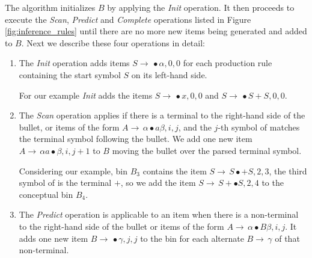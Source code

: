 \begin{isabellebody}
\begin{isamarkuptext}
The algorithm initializes $B$ by applying the \textit{Init} operation. It then proceeds to execute
the \textit{Scan}, \textit{Predict} and \textit{Complete} operations listed in Figure \ref{fig:inference_rules}
until there are no more new items being generated and added to $B$. Next we describe these four operations
in detail:

\begin{enumerate}
  \item The \textit{Init} operation adds items
    $S \rightarrow \, \bullet\alpha, 0, 0$ for each production rule containing the start symbol $S$ on its left-hand side.

    For our example \textit{Init} adds the items $S \rightarrow \, \bullet x, 0, 0$ and $S \rightarrow \, \bullet S + S, 0 , 0$.
  \item The \textit{Scan} operation applies if there is a terminal to the right-hand side of the bullet, or items of the form $A \rightarrow \, \alpha \bullet a \beta, i, j$,
    and the $j$-th symbol of \isa{{\isasymomega}} matches the terminal symbol following the bullet. We add one new item $A \rightarrow \, \alpha a \bullet \beta, i, j+1$
    to $B$ moving the bullet over the parsed terminal symbol.

    Considering our example, bin $B_3$ contains
    the item $S \rightarrow \, S \bullet + S, 2, 3$, the third symbol of \isa{{\isasymomega}} is the terminal $+$, so we add the
    item $S \rightarrow \, S + \bullet S, 2, 4$ to the conceptual bin $B_4$.
  \item The \textit{Predict} operation is applicable to an item when there is a non-terminal to the right-hand side of
    the bullet or items of the form $A \rightarrow \, \alpha \bullet B \beta, i, j$. It adds one new item $B \rightarrow \, \bullet \gamma, j, j$
    to the bin for each alternate $B \rightarrow \, \gamma$ of that non-terminal.


\end{enumerate}
\end{isamarkuptext}
\end{isabellebody}
